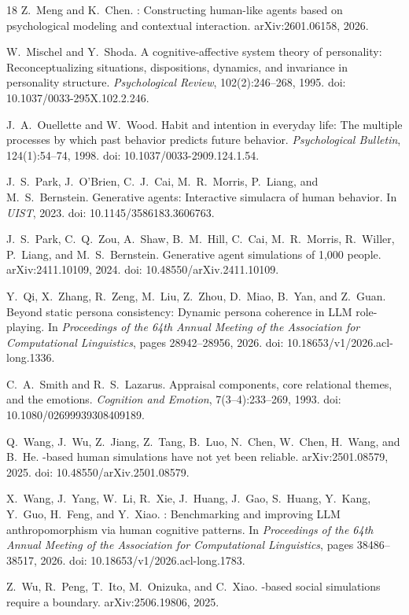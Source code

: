 \documentclass{article}
\begin{document}
\begin{thebibliography}{18}
Z.~Meng and K.~Chen.
: Constructing human-like agents based on psychological
  modeling and contextual interaction.
\newblock arXiv:2601.06158, 2026.

W.~Mischel and Y.~Shoda.
\newblock A cognitive-affective system theory of personality: Reconceptualizing
  situations, dispositions, dynamics, and invariance in personality structure.
\newblock \textit{Psychological Review}, 102(2):246--268, 1995.
\newblock doi: 10.1037/0033-295X.102.2.246.

J.~A.~Ouellette and W.~Wood.
\newblock Habit and intention in everyday life: The multiple processes by which
  past behavior predicts future behavior.
\newblock \textit{Psychological Bulletin}, 124(1):54--74, 1998.
\newblock doi: 10.1037/0033-2909.124.1.54.

J.~S.~Park, J.~O'Brien, C.~J.~Cai, M.~R.~Morris, P.~Liang, and
  M.~S.~Bernstein.
\newblock Generative agents: Interactive simulacra of human behavior.
\newblock In \textit{UIST}, 2023.
\newblock doi: 10.1145/3586183.3606763.

J.~S.~Park, C.~Q.~Zou, A.~Shaw, B.~M.~Hill, C.~Cai, M.~R.~Morris,
  R.~Willer, P.~Liang, and M.~S.~Bernstein.
\newblock Generative agent simulations of 1,000 people.
\newblock arXiv:2411.10109, 2024.
\newblock doi: 10.48550/arXiv.2411.10109.

Y.~Qi, X.~Zhang, R.~Zeng, M.~Liu, Z.~Zhou, D.~Miao, B.~Yan, and Z.~Guan.
\newblock Beyond static persona consistency: Dynamic persona coherence in
  {LLM} role-playing.
\newblock In \textit{Proceedings of the 64th Annual Meeting of the Association
  for Computational Linguistics}, pages 28942--28956, 2026.
\newblock doi: 10.18653/v1/2026.acl-long.1336.

C.~A.~Smith and R.~S.~Lazarus.
\newblock Appraisal components, core relational themes, and the emotions.
\newblock \textit{Cognition and Emotion}, 7(3--4):233--269, 1993.
\newblock doi: 10.1080/02699939308409189.

Q.~Wang, J.~Wu, Z.~Jiang, Z.~Tang, B.~Luo, N.~Chen, W.~Chen, H.~Wang, and
  B.~He.
-based human simulations have not yet been reliable.
\newblock arXiv:2501.08579, 2025.
\newblock doi: 10.48550/arXiv.2501.08579.

X.~Wang, J.~Yang, W.~Li, R.~Xie, J.~Huang, J.~Gao, S.~Huang, Y.~Kang,
  Y.~Guo, H.~Feng, and Y.~Xiao.
: Benchmarking and improving {LLM} anthropomorphism via
  human cognitive patterns.
\newblock In \textit{Proceedings of the 64th Annual Meeting of the Association
  for Computational Linguistics}, pages 38486--38517, 2026.
\newblock doi: 10.18653/v1/2026.acl-long.1783.

Z.~Wu, R.~Peng, T.~Ito, M.~Onizuka, and C.~Xiao.
-based social simulations require a boundary.
\newblock arXiv:2506.19806, 2025.

\end{thebibliography}
\end{document}
